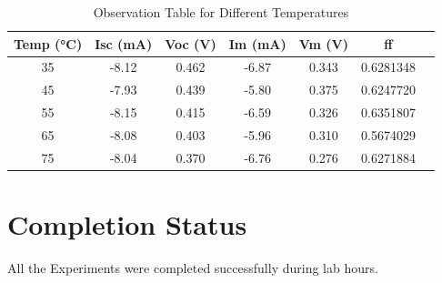\documentclass[a4paper]{article}
\begin{document}
\begin{table}[h!]
    \centering
    \begin{tabular}{|c|c|c|c|c|c|c|}
        \hline
        \textbf{Temp (°C)} & \textbf{Isc (mA)} & \textbf{Voc (V)} & \textbf{Im (mA)} & \textbf{Vm (V)} & \textbf{ff} \\ \hline
        35 & -8.12 & 0.462 & -6.87 & 0.343 & 0.6281348 \\ \hline
        45 & -7.93 & 0.439 & -5.80 & 0.375 & 0.6247720 \\ \hline
        55 & -8.15 & 0.415 & -6.59 & 0.326 & 0.6351807 \\ \hline
        65 & -8.08 & 0.403 & -5.96 & 0.310 & 0.5674029 \\ \hline
        75 & -8.04 & 0.370 & -6.76 & 0.276 & 0.6271884 \\ \hline
    \end{tabular}
    \caption{Observation Table for Different Temperatures}
\end{table}
\section{Completion Status}
All the Experiments were completed successfully during lab hours.
\end{document}
